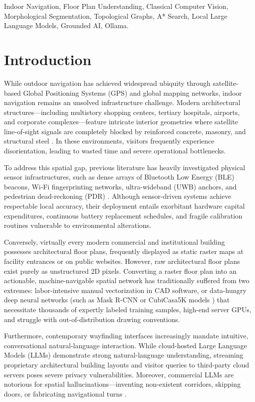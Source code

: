 \documentclass[conference]{IEEEtran}
\begin{document}
\begin{IEEEkeywords}
Indoor Navigation, Floor Plan Understanding, Classical Computer Vision, Morphological Segmentation, Topological Graphs, A* Search, Local Large Language Models, Grounded AI, Ollama.
\end{IEEEkeywords}

\section{Introduction}
While outdoor navigation has achieved widespread ubiquity through satellite-based Global Positioning Systems (GPS) and global mapping networks, indoor navigation remains an unsolved infrastructure challenge. Modern architectural structures—including multistory shopping centers, tertiary hospitals, airports, and corporate complexes—feature intricate interior geometries where satellite line-of-sight signals are completely blocked by reinforced concrete, masonry, and structural steel \cite{liu2007survey}. In these environments, visitors frequently experience disorientation, leading to wasted time and severe operational bottlenecks.

To address this spatial gap, previous literature has heavily investigated physical sensor infrastructures, such as dense arrays of Bluetooth Low Energy (BLE) beacons, Wi-Fi fingerprinting networks, ultra-wideband (UWB) anchors, and pedestrian dead-reckoning (PDR) \cite{zafari2019survey}. Although sensor-driven systems achieve respectable local accuracy, their deployment entails exorbitant hardware capital expenditures, continuous battery replacement schedules, and fragile calibration routines vulnerable to environmental alterations.

Conversely, virtually every modern commercial and institutional building possesses architectural floor plans, frequently displayed as static raster maps at facility entrances or on public websites. However, raw architectural floor plans exist purely as unstructured 2D pixels. Converting a raster floor plan into an actionable, machine-navigable spatial network has traditionally suffered from two extremes: labor-intensive manual vectorization in CAD software, or data-hungry deep neural networks (such as Mask R-CNN or CubiCasa5K models \cite{kalervo2019cubicasa5k}) that necessitate thousands of expertly labeled training samples, high-end server GPUs, and struggle with out-of-distribution drawing conventions.

Furthermore, contemporary wayfinding interfaces increasingly mandate intuitive, conversational natural-language interaction. While cloud-hosted Large Language Models (LLMs) demonstrate strong natural-language understanding, streaming proprietary architectural building layouts and visitor queries to third-party cloud servers poses severe privacy vulnerabilities. Moreover, commercial LLMs are notorious for spatial hallucinations—inventing non-existent corridors, skipping doors, or fabricating navigational turns \cite{huang2024hallucination}.
\end{document}
